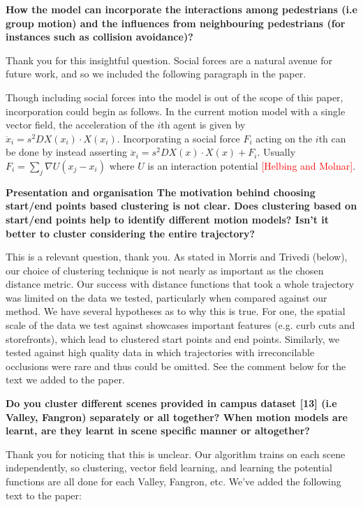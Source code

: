 \documentclass[usenames,dvipsnames]{article}
\newcommand{\todo}[1]{\textcolor{red}{#1}}
\providecommand{\response}[1]{
\noindent
\noindent\colorbox{gray!20}{
\parbox{\textwidth}{
\setlength{\parskip}{.1in}
\setlength{\parindent}{.1in}
#1}
}
}
\begin{document}
\begin{enumerate}
\begin{item}
\textbf{How the model can incorporate the interactions among pedestrians (i.e
group motion) and the influences from neighbouring pedestrians (for
instances such as collision avoidance)?}
\end{item}
Thank you for this insightful question. Social forces are a natural avenue for future work, and so we included the following paragraph in the paper.

\response{Though including social forces into the model is out of the scope of this paper, incorporation could begin as follows.  In the current motion model with a single vector field, the acceleration of the $i$th agent is given by $\ddot{x}_i = s^2 DX(x_i) \cdot X(x_i)$.  Incorporating a social force $F_{i}$ acting on the $i$th can be done by instead asserting $\ddot{x}_i = s^2 DX(x) \cdot X(x) + F_i$.  Usually $F_{i} = \sum_{j} \nabla U( x_j - x_i)$ where $U$ is an interaction potential \todo{[Helbing and Molnar]}.}


\begin{item}
\textbf{Presentation and organisation
The motivation behind choosing start/end points based clustering is not
clear. Does clustering based on start/end points help to identify
different motion models? Isn't it better to cluster considering the
entire trajectory? }
\end{item}
This is a relevant question, thank you. As stated in Morris and Trivedi (below), our choice of clustering technique is not nearly as important as the chosen distance metric. Our success with distance functions that took a whole trajectory was limited on the data we tested, particularly when compared against our method. We have several hypotheses as to why this is true.  For one, the spatial scale of the data we test against showcases important features (e.g. curb cuts and storefronts), which lead to clustered start points and end points. Similarly, we tested against high quality data in which trajectories with irreconcilable occlusions were rare and thus could be omitted. See the comment below for the text we added to the paper.



\begin{item}
\textbf{Do you cluster different scenes provided in campus dataset [13] (i.e
Valley, Fangron) separately or all together? When motion models are
learnt, are they learnt in scene specific manner or altogether?}
\end{item}
Thank you for noticing that this is unclear. Our algorithm trains on each scene independently, so clustering, vector field learning, and learning the potential functions are all done for each Valley, Fangron, etc. We've added the following text to the paper:


\end{enumerate}
\end{document}
